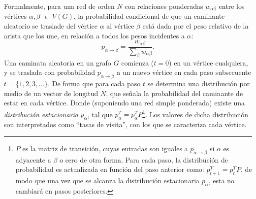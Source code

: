 \documentclass[letterpaper, 11pt]{book}
\theoremstyle{definition}
\theoremstyle{remark}
\begin{document}
Formalmente, para una red de orden $N$ con relaciones ponderadas $w_{\alpha \beta}$ entre los vértices $\alpha, \beta \text{ } \epsilon \text{ } V(G)$, la probabilidad condicional de que un caminante aleatorio se traslade del vértice $\alpha$ al vértice $\beta$ está dada por el peso relativo de la arista que los une, en relación a todos los pesos incidentes a $\alpha$: 
\begin{equation*}
    p_{\alpha \rightarrow \beta} = \frac{w_{\alpha \beta}}{\sum_{\beta}w_{\alpha \beta}}.
\end{equation*} 
Una caminata aleatoria en un grafo $G$ comienza ($t=0$) en un vértice cualquiera, y se traslada con probabilidad $p_{\alpha \rightarrow \beta}$ a un nuevo vértice en cada paso subsecuente $t=\{1,2,3,...\}$. 
De forma que para cada paso $t$ se determina una distribución por medio de un vector de longitud $N$, que señala la probabilidad del caminante de estar en cada vértice. 
Donde (suponiendo una red simple ponderada) existe una \emph{distribución estacionaria} $p_{\alpha}$, tal que $p_{\alpha}^{T} = p_{\alpha}^{T}P$\footnote{
    $P$ es la matriz de transición, cuyas entradas son iguales a $p_{\alpha \rightarrow \beta}$ si $\alpha$ es adyacente a $\beta$ o cero de otra forma. 
    Para cada paso, la distribución de probabilidad es actualizada en función del paso anterior como: $p_{t+1}^{T}=p_{t}^{T}P$, de modo que una vez que se alcanza la distribución estacionaria $p_{\alpha}$, esta no cambiará en pasos posteriores. 
}. 
Los valores de dicha distribución son interpretados como ``tasas de visita'', con los que se caracteriza cada vértice. 
\end{document}
